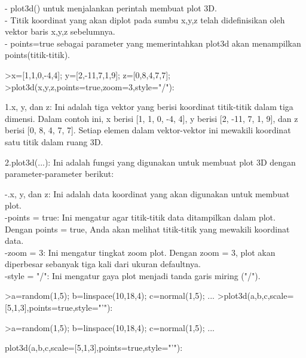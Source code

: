 \documentclass{article}
\begin{document}
\begin{eulernotebook}
\begin{eulercomment}
\begin{eulercomment}
\begin{eulercomment}
\begin{eulercomment}
\begin{eulercomment}
- plot3d() untuk menjalankan perintah membuat plot 3D.\\
- Titik koordinat yang akan diplot pada sumbu x,y,z telah
didefinisikan oleh vektor baris x,y,z sebelumnya.\\
- points=true sebagai parameter yang memerintahkan plot3d akan
menampilkan points(titik-titik).

\end{eulercomment}
\begin{eulerprompt}
>x=[1,1,0,-4,4]; y=[2,-11,7,1,9]; z=[0,8,4,7,7];
>plot3d(x,y,z,points=true,zoom=3,style="/"):
\end{eulerprompt}
\begin{eulercomment}
1.x, y, dan z: Ini adalah tiga vektor yang berisi koordinat
titik-titik dalam tiga dimensi. Dalam contoh ini, x berisi [1, 1, 0,
-4, 4], y berisi [2, -11, 7, 1, 9], dan z berisi [0, 8, 4, 7, 7].
Setiap elemen dalam vektor-vektor ini mewakili koordinat satu titik
dalam ruang 3D.

2.plot3d(...): Ini adalah fungsi yang digunakan untuk membuat plot 3D
dengan parameter-parameter berikut:

-.x, y, dan z: Ini adalah data koordinat yang akan digunakan untuk
membuat plot.\\
-points = true: Ini mengatur agar titik-titik data ditampilkan dalam
plot. Dengan points = true, Anda akan melihat titik-titik yang
mewakili koordinat data.\\
-zoom = 3: Ini mengatur tingkat zoom plot. Dengan zoom = 3, plot akan
diperbesar sebanyak tiga kali dari ukuran defaultnya.\\
-style = "/": Ini mengatur gaya plot menjadi tanda garis miring ("/").
\end{eulercomment}
\begin{eulerprompt}
>a=random(1,5); b=linspace(10,18,4); c=normal(1,5); ...
>plot3d(a,b,c,scale=[5,1,3],points=true,style="'"):
\end{eulerprompt}
\begin{eulercomment}
\textgreater{}a=random(1,5); b=linspace(10,18,4); c=normal(1,5); ...\\
\end{eulercomment}
\begin{eulerttcomment}
 plot3d(a,b,c,scale=[5,1,3],points=true,style="'"):
\end{eulerttcomment}
\begin{eulercomment}


\end{eulercomment}
\end{eulercomment}
\end{eulercomment}
\end{eulercomment}
\end{eulercomment}
\end{eulernotebook}
\end{document}
